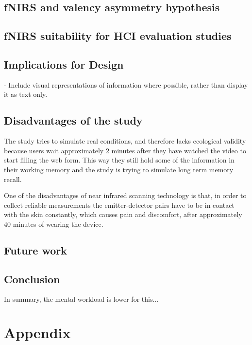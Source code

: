 \documentclass[a4paper]{report}
\begin{document}
		
		
	\section{fNIRS and valency asymmetry hypothesis}
	\section{fNIRS suitability for HCI evaluation studies}
	\section{Implications for Design}
		- Include visual representations of information where possible, rather than display it as text only.
	\section{Disadvantages of the study}
		The study tries to simulate real conditions, and therefore lacks ecological validity because users wait approximately 2 minutes after they have watched the video to start filling the web form. This way they still hold some of the information in their working memory and the study is trying to simulate long term memory recall.
		
		One of the disadvantages of near infrared scanning technology is that, in order to collect reliable measurements the emitter-detector pairs have to be in contact with the skin constantly, which causes pain and discomfort, after approximately 40 minutes of wearing the device.
	\section{Future work}
	\section{Conclusion}
		In summary, the mental workload is lower for this...
	
	
\chapter*{Appendix}
\end{document}
